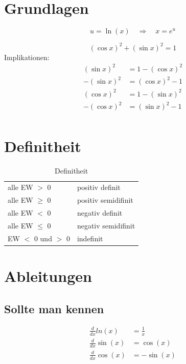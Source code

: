 \documentclass{article} %
\begin{document}
\tableofcontents
\section{Grundlagen}
\begin{equation}
    u = \ln(x) \quad \Rightarrow \quad x = e^u
\end{equation}

\begin{equation}
    (\cos{x})^2 + (\sin{x})^2 = 1
\end{equation}
Implikationen: 
\begin{align*}
    (\sin{x})^2 & = 1 - (\cos{x})^2 \\
    - (\sin{x})^2 & = (\cos{x})^2 -1 \\
    (\cos{x})^2 & = 1- (\sin{x})^2 \\
   - (\cos{x})^2 & = (\sin{x})^2 -1 \\
\end{align*}

\section{Definitheit}
\begin{table}[H]
    \centering
    \begin{tabular}{l|l}
        alle EW $>$ 0 & positiv definit \\
        alle EW $\geq$ 0 & positiv semidifinit \\
        alle EW $<$ 0 & negativ definit \\
        alle EW $\leq$ 0 & negativ semidifinit \\
        EW $<$ 0 und $>$ 0 & indefinit
    \end{tabular}
    \caption{Definitheit}
    \label{tab:Definitheit}
\end{table}

\section{Ableitungen}
\subsection{Sollte man kennen}
\begin{align}
    \frac{d}{dx} ln(x) &  = \frac{1}{x} \\
    \frac{d}{dx} \sin (x) & = \cos(x) \\
    \frac{d}{dx} \cos (x) & = -\sin(x) \\
\end{align}
\end{document}
